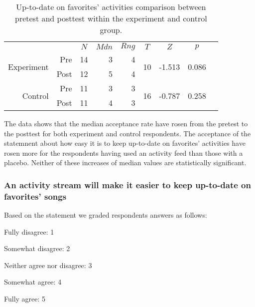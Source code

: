 \begin{table}[!h]
  \begin{tabular}{rrrrrrrrr}

    &
    &
    \multicolumn{1}{c}{$N$} &
    \multicolumn{1}{c}{$Mdn$} &
    \multicolumn{1}{c}{$Rng$} &
    \multicolumn{1}{c}{$T$} &
    \multicolumn{1}{c}{$Z$} &
    \multicolumn{1}{c}{$p$} \\

    \cmidrule(lr){3-8}

    \multirow{2}{*}{Experiment} &
    Pre &
    14 &
    3 &
    4 &
    \multirow{2}{*}{10} &
    \multirow{2}{*}{-1.513} &
    \multirow{2}{*}{0.086}\\

    &
    Post &
    12 &
    5 &
    4 &
    &
    \\

    \cmidrule(lr){2-8}

    \multirow{2}{*}{Control} &
    Pre &
    11 &
    3 &
    3 &
    \multirow{2}{*}{16} &
    \multirow{2}{*}{-0.787} &
    \multirow{2}{*}{0.258}\\

    &
    Post &
    11 &
    4 &
    3 &
    &
    \\

  \end{tabular}
  \caption[Up-to-date on Favorites' Activities, Within Groups]{%
    Up-to-date on favorites' activities  comparison between
    pretest and posttest within the experiment and control group.
  }
\end{table}

The data shows that the median acceptance rate have rosen from the pretest to
the posttest for both experiment and control respondents. The acceptance of
the statemnent about how easy it is to keep up-to-date on favorites'
activities have rosen more for the respondents having used an activity feed
than those with a placebo. Neither of these increases of median values
are statistically significant.

\subsubsection{An activity stream will make it easier to keep up-to-date on
  favorites' songs}

Based on the statement
we graded respondents answers as follows:

\begin{items}
  \item Fully disagree: 1
  \item Somewhat disagree: 2
  \item Neither agree nor disagree: 3
  \item Somewhat agree: 4
  \item Fully agree: 5
\end{items}

